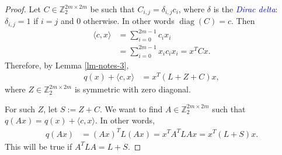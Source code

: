 \documentclass[12pt,a4paper]{article}
\newcommand{\mb}[1]{\mathbb{#1}}
\newcommand{\Z}{\mb{Z}}
\newcommand{\Emph}[1]{\emph{\textcolor{blue}{#1}}}
\newcommand{\diag}[1]{\operatorname{diag}\left(#1\right)}
\begin{document}
\begin{proof}
Let $C \in \Z_2^{2 m \times 2 m}$ be such that $C_{i,j} = \delta_{i,j} c_i$, where $\delta$ is the
\Emph{Dirac delta}: $\delta_{i,j}=1$ if $i=j$ and $0$ otherwise. 
In other words $\diag{C} = c$.
Then
\begin{align*}
\langle c, x \rangle 
&= 
\sum_{i=0}^{2m-1} c_i x_i
\\
&= 
\sum_{i=0}^{2m-1} x_i c_i x_i
= 
x^T C x.
\end{align*}
Therefore, by Lemma \ref{lm-notes-3},
\begin{align*}
q(x) + \langle c, x \rangle
&=
x^T (L + Z + C) x,
\end{align*}
where $Z \in \Z_2^{2 m \times 2 m}$ is symmetric with zero diagonal.

For such $Z$, let $S := Z + C$. 
We want to find $A \in \Z_2^{2 m \times 2 m}$ such that $q(A x) = q(x) + \langle c, x \rangle.$
In other words,
\begin{align*}
q(A x) 
&= 
(A x)^T L (A x) 
= 
x^T A^T L A x 
= 
x^T (L + S) x.
\end{align*}
This will be true if $A^T L A = L + S.$


\end{proof}
\end{document}
